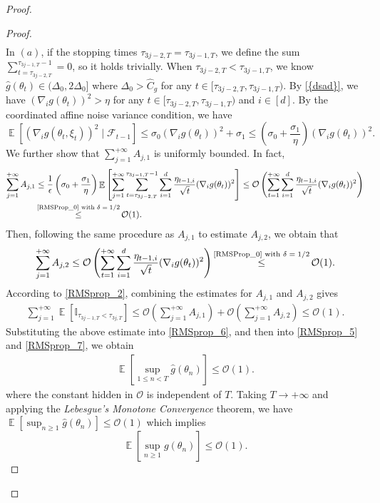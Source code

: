\documentclass[standalone]{article}
\newcommand{\I}{\mathbb{I}}
\DeclareMathOperator{\Expect}{\mathbb{E}}
\begin{document}
\begin{proof}
\begin{proof}
\begin{align*}
\end{align*}
In \((a)\), if the stopping times \(\tau_{3j-2,T} = \tau_{3j-1,T}\), we define the sum \(\sum_{t=\tau_{3j-2,T}}^{\tau_{3j-1,T}-1} = 0\), so it holds trivially. When \(\tau_{3j-2,T} < \tau_{3j-1,T}\), we know $\hat{g}(\theta_t) \in (\Delta_0, 2\Delta_0]$ where $\Delta_0 > \hat{C}_g$ for any \(t \in [\tau_{3j-2,T}, \tau_{3j-1,T})\). By \cref{{dsad}}, we have \((\nabla_{i}g(\theta_{t}))^{2} > \eta\) for any \(t \in [\tau_{3j-2,T}, \tau_{3j-1,T})\)  and $i \in [d]$. By the coordinated affine noise variance condition, we have \[\Expect\left[(\nabla_{i}g(\theta_{t}, \xi_{t}))^{2} \mid \mathscr{F}_{t-1}\right] \leq \sigma_{0}(\nabla_{i}g(\theta_{t}))^{2} + \sigma_{1} \leq \left(\sigma_{0} + \frac{\sigma_{1}}{\eta}\right)(\nabla_{i}g(\theta_{t}))^{2}.\]
We further show that $ \sum_{j=1}^{+\infty}A_{j,1}$ is uniformly bounded. In fact,
\begin{align*}
    \sum_{j=1}^{+\infty}A_{j,1}&\le \frac{1}{\epsilon}\left(\sigma_{0}+\frac{\sigma_{1}}{\eta}\right)\Expect\left[\sum_{j=1}^{+\infty}\sum_{t=\tau_{3j-2,T}}^{\tau_{3j-1,T}-1}\sum_{i=1}^{d}\frac{\eta_{{t-1},i}}{\sqrt{t}}(\nabla_{i}g(\theta_{t}))^{2}\right] \leq \mathcal{O}\left(\sum_{t=1}^{+\infty}\sum_{i=1}^{d}\frac{\eta_{{t-1},i}}{\sqrt{t}}(\nabla_{i}g(\theta_{t}))^{2}\right)\\&\mathop{\le}^{\text{\cref{RMSProp_0} with $\delta=1/2$}}\mathcal{O}(1).
\end{align*}
Then, following the same procedure as $A_{j,1}$ to estimate \(A_{j,2}\), we obtain that
\begin{align*}
 \sum_{j=1}^{+\infty}A_{j,2}\le \mathcal{O}\left(\sum_{t=1}^{+\infty}\sum_{i=1}^{d}\frac{\eta_{{t-1},i}}{\sqrt{t}}(\nabla_{i}g(\theta_{t}))^{2}\right)\mathop{\le}^{\text{\cref{RMSProp_0} with $\delta=1/2$}}\mathcal{O}(1).  
\end{align*}
According to \cref{RMSprop_2}, combining the estimates for $A_{j,1}$ and $A_{j,2}$ gives
\begin{align*}
\sum_{j=1}^{+\infty}\Expect\left[\I_{\tau_{3j-1,T}<\tau_{3j,T}}\right]\le \mathcal{O}\left(\sum_{j=1}^{+\infty}A_{j,1}\right)+\mathcal{O}\left(\sum_{j=1}^{+\infty}A_{j,2}\right)\le \mathcal{O}(1).
\end{align*}
Substituting the above estimate into \cref{RMSprop_6}, and then into \cref{RMSprop_5} and \cref{RMSprop_7}, we obtain
\begin{align*}
\Expect\left[\sup_{1\le n<T}\hat{g}(\theta_{n})\right]  \le \mathcal{O}(1).
\end{align*}
where the constant hidden in \(\mathcal{O}\) is independent of \(T\). Taking \(T \to +\infty\) and applying the \emph{Lebesgue's Monotone Convergence} theorem, we have
$\Expect\left[\sup_{n\ge 1}\hat{g}(\theta_{n})\right] \leq  \mathcal{O}(1) $
which implies
\[\Expect\left[\sup_{n\ge 1}{g}(\theta_{n})\right] \leq  \mathcal{O}(1).\]
\end{proof}




\end{proof}
\end{document}
